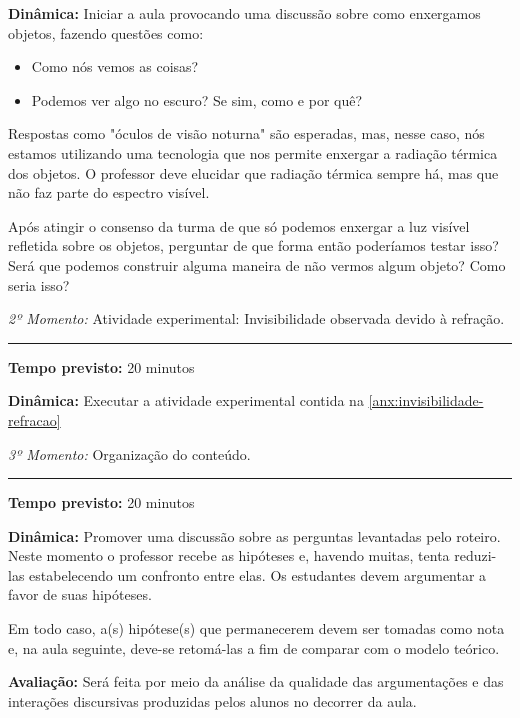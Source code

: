         \noindent \textbf{Dinâmica:} Iniciar a aula provocando uma discussão sobre como enxergamos objetos, fazendo questões como:
        \begin{itemize}
            \item Como nós vemos as coisas?
            \item Podemos ver algo no escuro? Se sim, como e por quê?
        \end{itemize}
        Respostas como "óculos de visão noturna" são esperadas, mas, nesse caso, nós estamos utilizando uma tecnologia que nos permite enxergar a radiação térmica dos objetos. O professor deve elucidar que radiação térmica sempre há, mas que não faz parte do espectro visível.
        
        Após atingir o consenso da turma de que só podemos enxergar a luz visível refletida sobre os objetos, perguntar de que forma então poderíamos testar isso? Será que podemos construir alguma maneira de não vermos algum objeto? Como seria isso?
        
        \vspace{50pt}
        \noindent \emph{2º Momento:} Atividade experimental: Invisibilidade observada devido à refração.
        \par\noindent\rule{.3\textwidth}{.5pt}    
        \par\noindent \textbf{Tempo previsto: }20 minutos        

        \noindent \textbf{Dinâmica:} Executar a atividade experimental contida na \autoref{anx:invisibilidade-refracao}

        \vspace{50pt}
        \noindent \emph{3º Momento:} Organização do conteúdo.
        \par\noindent\rule{.3\textwidth}{.5pt}
        \par\noindent \textbf{Tempo previsto: }20 minutos
        
        \par\noindent \textbf{Dinâmica:} Promover uma discussão sobre as perguntas levantadas pelo roteiro. Neste momento o professor recebe as hipóteses e, havendo muitas, tenta reduzi-las estabelecendo um confronto entre elas. Os estudantes devem argumentar a favor de suas hipóteses. 

        Em todo caso, a(s) hipótese(s) que permanecerem devem ser tomadas como nota e, na aula seguinte, deve-se retomá-las a fim de comparar com o modelo teórico. 
        \par\noindent \textbf{Avaliação:} Será feita por meio da análise da qualidade das argumentações e das interações discursivas produzidas pelos alunos no decorrer da aula.        


%  